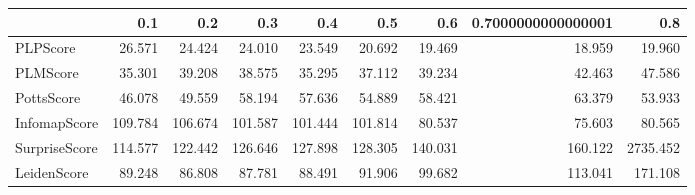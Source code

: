 \begin{tabular}{lrrrrrrrr}
\toprule
{} &     0.1 &     0.2 &     0.3 &     0.4 &     0.5 &     0.6 & 0.7000000000000001 &      0.8 \\
\midrule
PLPScore      &  26.571 &  24.424 &  24.010 &  23.549 &  20.692 &  19.469 &             18.959 &   19.960 \\
PLMScore      &  35.301 &  39.208 &  38.575 &  35.295 &  37.112 &  39.234 &             42.463 &   47.586 \\
PottsScore    &  46.078 &  49.559 &  58.194 &  57.636 &  54.889 &  58.421 &             63.379 &   53.933 \\
InfomapScore  & 109.784 & 106.674 & 101.587 & 101.444 & 101.814 &  80.537 &             75.603 &   80.565 \\
SurpriseScore & 114.577 & 122.442 & 126.646 & 127.898 & 128.305 & 140.031 &            160.122 & 2735.452 \\
LeidenScore   &  89.248 &  86.808 &  87.781 &  88.491 &  91.906 &  99.682 &            113.041 &  171.108 \\
\bottomrule
\end{tabular}
